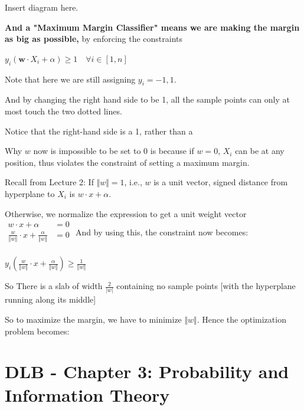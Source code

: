 \documentclass{report}
\begin{document}
Insert diagram here.\newline\newline

\textbf{And a "Maximum Margin Classifier" means we are making the margin as big as possible, } by enforcing the constraints \newline
\centerline{$y_i(\bm{w} \cdot X_i + \alpha) \geq 1 \quad \forall i \in [1,n]$}\newline\newline

Note that here we are still assigning $y_i = -1, 1$.

And by changing the right hand side to be 1, all the sample points can only at most touch the two dotted lines.

Notice that the right-hand side is a 1, rather than a 

Why $w$ now is impossible to be set to 0 is because if $w=0$, $X_i$ can be at any position, thus violates the constraint of setting a maximum margin.

Recall from Lecture 2: If $\Vert w \Vert = 1$, i.e., $w$ is a unit vector, signed distance from hyperplane to $X_i$ is $w \cdot x + \alpha$. \newline

Otherwise, we normalize the expression to get a unit weight vector\newline
$\begin{aligned}
	w \cdot x + \alpha &= 0 \\
    \frac{w}{\Vert w \Vert} \cdot x + \frac{\alpha}{\Vert w \Vert} &= 0 \\
\end{aligned}$
And by using this, the constraint now becomes:\newline
\centerline{$y_i(\frac{w}{\Vert w \Vert} \cdot x + \frac{\alpha}{\Vert w \Vert}) \geq \frac{1}{\Vert w \Vert}$}

So There is a slab of width $\frac{2}{|w|}$ containing no sample points [with the hyperplane running along its middle]\newline

So to maximize the margin, we have to minimize $\Vert w \Vert$. Hence the optimization problem becomes:\\

\chapter{DLB - Chapter 3: Probability and Information Theory}
\end{document}
